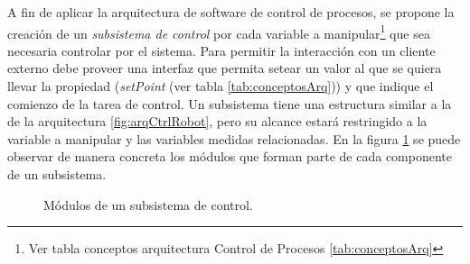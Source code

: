 A fin de aplicar la arquitectura de software de control de procesos, se propone la creación de un \textit{subsistema de control} por cada variable a manipular\footnote{Ver tabla conceptos arquitectura Control de Procesos \ref{tab:conceptosArq}} que sea necesaria controlar por el sistema. Para permitir la interacción con un cliente externo debe proveer una interfaz que permita setear un valor al que se quiera llevar la propiedad (\textit{setPoint} (ver tabla \ref{tab:conceptosArq})) y que indique el comienzo de la tarea de control. Un subsistema tiene una estructura similar a la de la arquitectura \ref{fig:arqCtrlRobot}, pero su alcance estará restringido a la variable a manipular y las variables medidas relacionadas. En la figura \ref{modulosSub} se puede observar de manera concreta los módulos que forman parte de cada componente de un subsistema.


\begin{figure}[H]
\caption{Módulos de un subsistema de control.}
\label{modulosSub}
\begin{center}
\end{center}
\end{figure}

